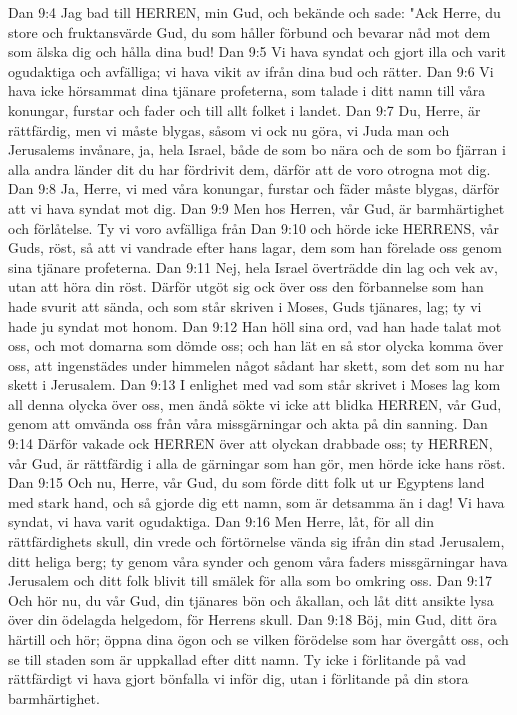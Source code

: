 Dan 9:4  Jag bad till HERREN, min Gud, och bekände och sade: "Ack Herre, du store och fruktansvärde Gud, du som håller förbund och bevarar nåd mot dem som älska dig och hålla dina bud!
Dan 9:5  Vi hava syndat och gjort illa och varit ogudaktiga och avfälliga; vi hava vikit av ifrån dina bud och rätter.
Dan 9:6  Vi hava icke hörsammat dina tjänare profeterna, som talade i ditt namn till våra konungar, furstar och fader och till allt folket i landet.
Dan 9:7  Du, Herre, är rättfärdig, men vi måste blygas, såsom vi ock nu göra, vi Juda man och Jerusalems invånare, ja, hela Israel, både de som bo nära och de som bo fjärran i alla andra länder dit du har fördrivit dem, därför att de voro otrogna mot dig.
Dan 9:8  Ja, Herre, vi med våra konungar, furstar och fäder måste blygas, därför att vi hava syndat mot dig.
Dan 9:9  Men hos Herren, vår Gud, är barmhärtighet och förlåtelse. Ty vi voro avfälliga från
Dan 9:10  och hörde icke HERRENS, vår Guds, röst, så att vi vandrade efter hans lagar, dem som han förelade oss genom sina tjänare profeterna.
Dan 9:11  Nej, hela Israel överträdde din lag och vek av, utan att höra din röst. Därför utgöt sig ock över oss den förbannelse som han hade svurit att sända, och som står skriven i Moses, Guds tjänares, lag; ty vi hade ju syndat mot honom.
Dan 9:12  Han höll sina ord, vad han hade talat mot oss, och mot domarna som dömde oss; och han lät en så stor olycka komma över oss, att ingenstädes under himmelen något sådant har skett, som det som nu har skett i Jerusalem.
Dan 9:13  I enlighet med vad som står skrivet i Moses lag kom all denna olycka över oss, men ändå sökte vi icke att blidka HERREN, vår Gud, genom att omvända oss från våra missgärningar och akta på din sanning.
Dan 9:14  Därför vakade ock HERREN över att olyckan drabbade oss; ty HERREN, vår Gud, är rättfärdig i alla de gärningar som han gör, men hörde icke hans röst.
Dan 9:15  Och nu, Herre, vår Gud, du som förde ditt folk ut ur Egyptens land med stark hand, och så gjorde dig ett namn, som är detsamma än i dag! Vi hava syndat, vi hava varit ogudaktiga.
Dan 9:16  Men Herre, låt, för all din rättfärdighets skull, din vrede och förtörnelse vända sig ifrån din stad Jerusalem, ditt heliga berg; ty genom våra synder och genom våra faders missgärningar hava Jerusalem och ditt folk blivit till smälek för alla som bo omkring oss.
Dan 9:17  Och hör nu, du vår Gud, din tjänares bön och åkallan, och låt ditt ansikte lysa över din ödelagda helgedom, för Herrens skull.
Dan 9:18  Böj, min Gud, ditt öra härtill och hör; öppna dina ögon och se vilken förödelse som har övergått oss, och se till staden som är uppkallad efter ditt namn. Ty icke i förlitande på vad rättfärdigt vi hava gjort bönfalla vi inför dig, utan i förlitande på din stora barmhärtighet.

